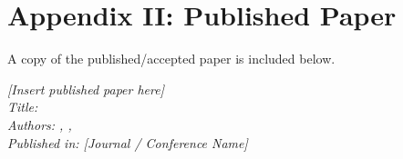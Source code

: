 
\newpage
\chapter*{Appendix II: Published Paper}

\justify
A copy of the published/accepted paper is included below.

\vspace{1cm}

% 

\begin{mdframed}
    \centering
    \vspace{3cm}
    \textit{[Insert published paper here]}\\[0.5cm]
    \textit{Title: \ProjectTitle}\\[0.3cm]
    \textit{Authors: \AuthorOne, \AuthorTwo, \AuthorThree}\\[0.3cm]
    \textit{Published in: [Journal / Conference Name]}
    \vspace{3cm}
\end{mdframed}
